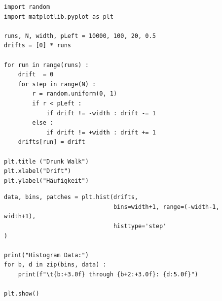 
\begin{frame}[fragile]
%
\begin{codebox}
\begin{verbatim}
import random
import matplotlib.pyplot as plt

runs, N, width, pLeft = 10000, 100, 20, 0.5
drifts = [0] * runs

for run in range(runs) :
    drift  = 0
    for step in range(N) :
        r = random.uniform(0, 1)
        if r < pLeft :
            if drift != -width : drift -= 1
        else :
            if drift != +width : drift += 1
    drifts[run] = drift

plt.title ("Drunk Walk")
plt.xlabel("Drift")
plt.ylabel("Häufigkeit")
\end{verbatim}
\end{codebox}
%
\end{frame}


\begin{frame}[fragile]
%
\begin{codebox}[... continued]
\begin{verbatim}
data, bins, patches = plt.hist(drifts, 
                               bins=width+1, range=(-width-1, width+1),
                               histtype='step'
)

print("Histogram Data:")
for b, d in zip(bins, data) :
    print(f"\t{b:+3.0f} through {b+2:+3.0f}: {d:5.0f}")

plt.show()
\end{verbatim}
\end{codebox}
%
\end{frame}


